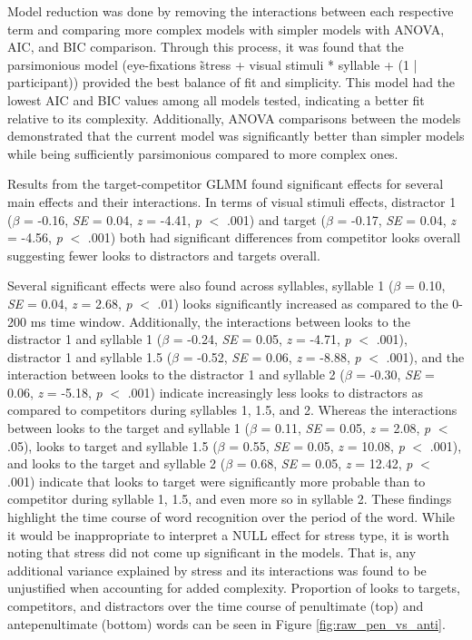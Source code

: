 Model reduction was done by removing the interactions between each respective term and comparing more complex models with simpler models with ANOVA, AIC, and BIC comparison. Through this process, it was found that the parsimonious model (eye-fixations \~ stress + visual stimuli * syllable + (1 | participant)) provided the best balance of fit and simplicity. This model had the lowest AIC and BIC values among all models tested, indicating a better fit relative to its complexity. Additionally, ANOVA comparisons between the models demonstrated that the current model was significantly better than simpler models while being sufficiently parsimonious compared to more complex ones.

Results from the target-competitor GLMM found significant effects for several main effects and their interactions. In terms of visual stimuli effects, distractor 1 ($\beta$ = -0.16, \textit{SE} = 0.04, \textit{z} = -4.41, \textit{p} $<$ .001) and target ($\beta$ = -0.17, \textit{SE} = 0.04, \textit{z} = -4.56, \textit{p} $<$ .001) both had significant differences from competitor looks overall suggesting fewer looks to distractors and targets overall. 

Several significant effects were also found across syllables, syllable 1 ($\beta$ = 0.10, \textit{SE} = 0.04, \textit{z} = 2.68, \textit{p} $<$ .01) looks significantly increased as compared to the 0-200 ms time window. Additionally, the interactions between looks to the distractor 1 and syllable 1 ($\beta$ = -0.24, \textit{SE} = 0.05, \textit{z} = -4.71, \textit{p} $<$ .001), distractor 1 and syllable 1.5 ($\beta$ = -0.52, \textit{SE} = 0.06, \textit{z} = -8.88, \textit{p} $<$ .001), and the interaction between looks to the distractor 1 and syllable 2 ($\beta$ = -0.30, \textit{SE} = 0.06, \textit{z} = -5.18, \textit{p} $<$ .001) indicate increasingly less looks to distractors as compared to competitors during syllables 1, 1.5, and 2. Whereas the interactions between looks to the target and syllable 1 ($\beta$ = 0.11, \textit{SE} = 0.05, \textit{z} = 2.08, \textit{p} $<$ .05), looks to target and syllable 1.5 ($\beta$ = 0.55, \textit{SE} = 0.05, \textit{z} = 10.08, \textit{p} $<$ .001), and looks to the target and syllable 2 ($\beta$ = 0.68, \textit{SE} = 0.05, \textit{z} = 12.42, \textit{p} $<$ .001) indicate that looks to target were significantly more probable than to competitor during syllable 1, 1.5, and even more so in syllable 2. These findings highlight the time course of word recognition over the period of the word. While it would be inappropriate to interpret a NULL effect for stress type, it is worth noting that stress did not come up significant in the models. That is, any additional variance explained by stress and its interactions was found to be unjustified when accounting for added complexity. Proportion of looks to targets, competitors, and distractors over the time course of penultimate (top) and antepenultimate (bottom) words can be seen in Figure \ref{fig:raw_pen_vs_anti}.

